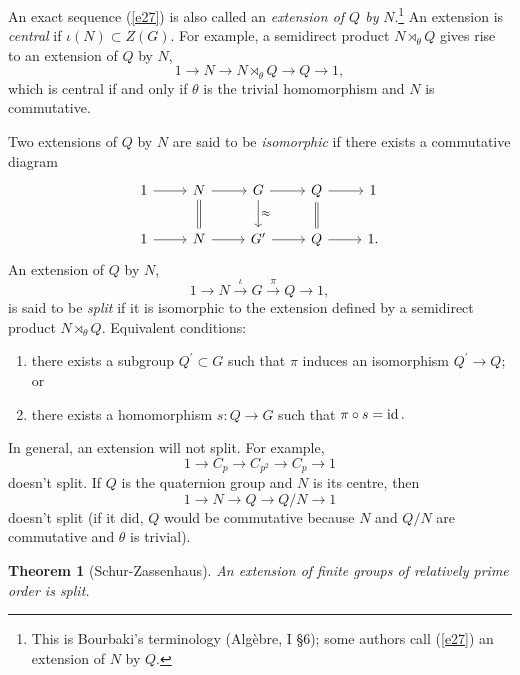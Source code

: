 \documentclass[a4paper,11pt,final]{memoir}%
\newtheorem{theorem}[X]{Theorem}
\theoremstyle{nonumberplain}
\begin{document}
An exact sequence (\ref{e27}) is also called an \emph{extension of $Q$ by}
$N$.\footnote{This is Bourbaki's terminology (Alg\`{e}bre, I \S 6); some
authors call (\ref{e27}) an extension of $N$ by $Q$.}%
An extension is \emph{central}%
%
\emph{\/} if $\iota(N)\subset Z(G)$. For example, a semidirect product
$N\rtimes_{\theta}Q$ gives rise to an extension of $Q$ by $N$,
\[
1\rightarrow N\rightarrow N\rtimes_{\theta}Q\rightarrow Q\rightarrow1,
\]
which is central if and only if $\theta$ is the trivial homomorphism and $N$ is commutative.

Two extensions of $Q$ by $N$ are said to be \emph{isomorphic}%
if there exists a commutative diagram
\[
\begin{tikzcd}1\arrow{r}&N\arrow{r}\arrow[equals]{d}&G\arrow{r}\arrow{d}{\approx}&Q\arrow{r}\arrow[equals]{d}&1\\
1\arrow{r}&N\arrow{r}&G^{\prime}\arrow{r}&Q\arrow{r}&1.\end{tikzcd}
\]
An extension of $Q$ by $N$,%
\[
1\rightarrow N\overset{\iota}{\rightarrow}G\overset{\pi}{\rightarrow
}Q\rightarrow1,
\]
is said to be \emph{split\/}%
if it is isomorphic to the extension defined by a semidirect product
$N\rtimes_{\theta}Q$. Equivalent conditions:

\begin{enumerate}
\item there exists a subgroup $Q^{\prime}\subset G$ such that $\pi$ induces an
isomorphism $Q^{\prime}\rightarrow Q$; or

\item there exists a homomorphism $s\colon Q\rightarrow G$ such that $\pi\circ
s=\operatorname{id}.$
\end{enumerate}

In general, an extension will not split. For example,
\[
1\rightarrow C_{p}\rightarrow C_{p^{2}}\rightarrow C_{p}\rightarrow1
\]
doesn't split. If $Q$ is the quaternion group and $N$ is its centre, then%
\begin{equation}
1\rightarrow N\rightarrow Q\rightarrow Q/N\rightarrow1 \label{e32}%
\end{equation}
doesn't split (if it did, $Q$ would be commutative because $N$ and $Q/N$ are
commutative and $\theta$ is trivial).

\begin{theorem}
[Schur-Zassenhaus]\label{it17}%
An extension of finite groups of relatively prime order is split.
\end{theorem}
\end{document}
